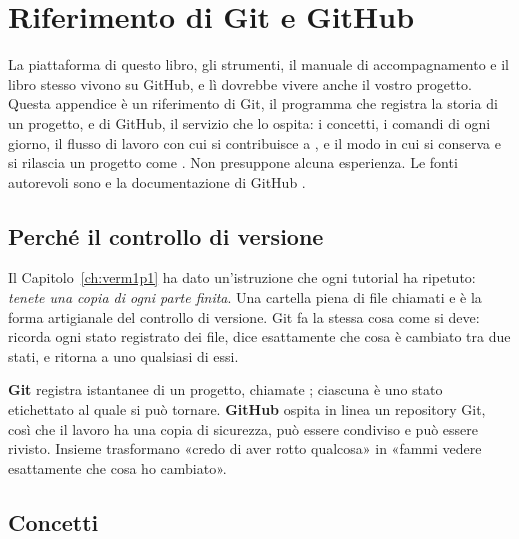 \chapter{Riferimento di Git e GitHub}
\label{app:github}

La piattaforma di questo libro, gli strumenti, il manuale di accompagnamento e
il libro stesso vivono su GitHub, e lì dovrebbe vivere anche il vostro
progetto. Questa appendice è un riferimento di Git, il programma che registra
la storia di un progetto, e di GitHub, il servizio che lo ospita: i concetti,
i comandi di ogni giorno, il flusso di lavoro con cui si contribuisce a \prg,
e il modo in cui si conserva e si rilascia un progetto come \vermone. Non
presuppone alcuna esperienza. Le fonti autorevoli sono \citet{progit} e la
documentazione di GitHub \citep{githubdocs}.

\section{Perché il controllo di versione}

Il Capitolo~\ref{ch:verm1p1} ha dato un'istruzione che ogni tutorial ha
ripetuto: \emph{tenete una copia di ogni parte finita}. Una cartella piena di
file chiamati  e  è la
forma artigianale del controllo di versione. Git fa la stessa cosa come si
deve: ricorda ogni stato registrato dei file, dice esattamente che cosa è
cambiato tra due stati, e ritorna a uno qualsiasi di essi.

\begin{prgconcept}
\textbf{Git} registra istantanee di un progetto, chiamate ;
ciascuna è uno stato etichettato al quale si può tornare. \textbf{GitHub}
ospita in linea un repository Git, così che il lavoro ha una copia di
sicurezza, può essere condiviso e può essere rivisto. Insieme trasformano
«credo di aver rotto qualcosa» in «fammi vedere esattamente che cosa ho
cambiato».
\end{prgconcept}

\section{Concetti}

